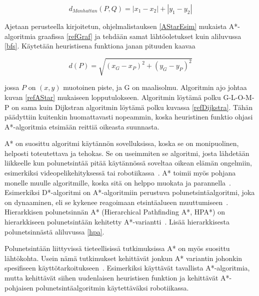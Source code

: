 \[ d_{Manhattan}(P,Q) =  |x_1 - x_2| + |y_1 - y_2|\]
\par

	Ajetaan \textcite{MathewAndMalathy} perusteella kirjoitetun, 
ohjelmalistauksen \ref{AStarEsim} mukaista A*-algoritmia graafissa 
\ref{refGraf} ja tehdään samat lähtöoletukset kuin aliluvussa \ref{bfs}. 
Käytetään heuristisena funktiona janan pituuden kaavaa

\[ d(P) = \sqrt{(x_G-x_P)^2 + (y_G-y_P)^2} \]

jossa $P$ on $(x,y)$ muotoinen piste, ja G on maalisolmu. Algoritmin ajo 
johtaa kuvan \ref{refAStar} mukaiseen lopputulokseen. Algoritmin löytämä polku 
G-L-O-M-P on sama kuin Dijkstran algoritmin löytämä polku kuvassa 
\ref{refDijkstra}. Tähän päädyttiin kuitenkin huomattavasti nopeammin, koska 
heuristinen funktio ohjasi A*-algoritmia etsimään reittiä oikeasta suunnasta. 
\par
	A* on suosittu algoritmi käytännön sovelluksissa, koska se on 
monipuolinen, helposti toteutettava ja tehokas. Se on useimmiten se algoritmi, 
josta lähdetään liikkeelle kun polunetsintää pitää käytännössä soveltaa 
oikean elämän ongelmiin, esimerkiksi videopelikehityksessä tai 
robotiikassa~\cite{ProcediaAStar}. A* toimii myös pohjana monelle muulle 
algoritmille, koska sitä on helppo muokata ja parannella~\cite{ProcediaAStar}. 
Esimerkiksi D*-algoritmi on A*-algoritmiin perustuva polunetsintäalgoritmi, 
joka on dynaaminen, eli se kykenee reagoimaan etsintäalueen 
muuttumiseen~\cite{applSciLawande}. Hierarkkisen polunetsinnän A* (Hierarchical 
Pathfinding A*, HPA*) on hierarkkiseen polunetsintään kehitetty 
A*-variantti~\cite{applSciLawande}. Lisää hierarkkisesta polunetsinnästä 
aliluvussa \ref{hpa}. \par
	Polunetsintään liittyvissä tieteellisissä tutkimuksissa A* on myös 
suosittu lähtökohta. Usein nämä tutkimukset kehittävät jonkun A* variantin 
johonkin spesifiseen käyttötarkoitukseen~\cite{ProcediaAStar}. Esimerkiksi 
\textcite{MathewAndMalathy} käyttävät tavallista A*-algoritmia, mutta 
kehittävät siihen uudenlaisen heuristisen funktion ja 
\textcite{DelaunayVoronoiAStar} kehittävät A*-pohjaisen polunetsintäalgoritmin 
käytettäväksi robotiikassa.

